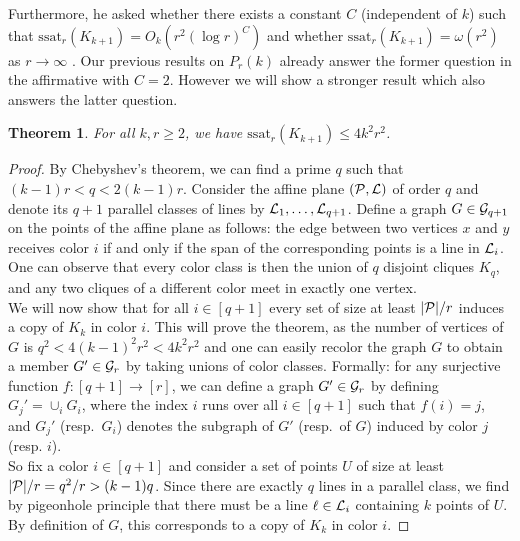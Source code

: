 \documentclass[12pt]{article}
\newcommand{\cG}{{\cal G}}
\newcommand{\cL}{{\cal L}}
\newcommand{\cP}{{\cal P}}
\newtheorem{theorem}{Theorem}
\theoremstyle{definition}
\begin{document}
	Furthermore, he asked \cite[Question 4.2]{tran2022two} whether there exists a constant $C$ (independent of $k$) such that $\mathrm{ssat}_r(K_{k+1}) = O_k(r^2(\log r)^C)$ and whether $\mathrm{ssat}_r(K_{k+1}) = \omega(r^2)$ as $r \to \infty$ \cite[Question 4.1]{tran2022two}. Our previous results on $P_r(k)$ already answer the former question in the affirmative with $C = 2$. However we will show a stronger result which also answers the latter question. 
	
	\begin{theorem}\label{thm:semisaturation}
		For all $k,r \geq 2$, we have $\mathrm{ssat}_r(K_{k+1}) \leq 4k^2r^2$.
	\end{theorem}
	
	\begin{proof}
		By Chebyshev's theorem, we can find a prime $q$ such that $(k-1)r < q < 2(k-1)r$. Consider the affine plane $(\cP,\cL)$ of order $q$ and denote its $q+1$ parallel classes of lines by $\cL_1,\dots,\cL_{q+1}$. Define a graph $G \in \cG_{q+1}$ on the points of the affine plane as follows: the edge between two vertices $x$ and $y$ receives color $i$ if and only if the span of the corresponding points is a line in $\cL_i$. One can observe that every color class is then the union of $q$ disjoint cliques $K_q$, and any two cliques of a different color meet in exactly one vertex. \\ 
		
		We will now show that for all $i \in [q+1]$ every set of size at least $|\cP|/r$ induces a copy of $K_k$ in color $i$. This will prove the theorem, as the number of vertices of $G$ is $q^2 < 4(k-1)^2r^2 < 4k^2r^2$ and one can easily recolor the graph $G$ to obtain a member $G' \in \cG_r$ by taking unions of color classes. Formally: for any surjective function $f:[q+1]\to[r]$, we can define a graph $G' \in \cG_r$ by defining $G_j' = \cup_i G_i$, where the index $i$ runs over all $i \in [q+1]$ such that $f(i) = j$, and $G_j'$ (resp.\ $G_i$) denotes the subgraph of $G'$ (resp.\ of $G$) induced by color $j$ (resp. $i$).   \\
		
		So fix a color $i \in [q+1]$ and consider a set of points $U$ of size at least $|\cP|/r = q^2/r > (k-1)q$. Since there are exactly $q$ lines in a parallel class, we find by pigeonhole principle that there must be a line $\ell \in \cL_i$ containing $k$ points of $U$. By definition of $G$, this corresponds to a copy of $K_k$ in color $i$.
	\end{proof}
	
\end{document}
